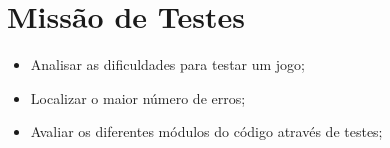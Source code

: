 \chapter[Missão de Testes]{Missão de Testes}
\begin{itemize}
\item Analisar as dificuldades para testar um jogo;
\item Localizar o maior número de erros;
\item Avaliar os diferentes módulos do código através de testes;
\end{itemize}
